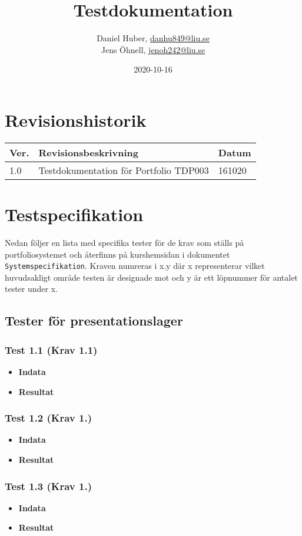 \documentclass{TDP003mall}
\author{Daniel Huber, \url{danhu849@liu.se}\\
  Jens Öhnell, \url{jenoh242@liu.se}}
\title{Testdokumentation}
\date{2020-10-16}
\begin{document}
\projectpage
\section{Revisionshistorik}
\begin{table}[!h]
\begin{tabularx}{\linewidth}{|l|X|l|}
\hline
Ver. & Revisionsbeskrivning & Datum \\\hline
1.0 & Testdokumentation för Portfolio TDP003 & 161020 \\\hline
\end{tabularx}
\end{table}


\section{Testspecifikation}
Nedan följer en lista med specifika tester för de krav som ställs på portfoliosystemet och återfinns på kurshemsidan i dokumentet \texttt{Systemspecifikation}. Kraven numreras i x.y där x representerar vilket huvudsakligt område testen är designade mot och y är ett löpnummer för antalet tester under x.

\subsection{Tester för presentationslager}
\subsubsection*{Test 1.1 (Krav 1.1)}
\begin{itemize}
\item[]\textbf{Indata} 
\item[]\textbf{Resultat} 
\end{itemize}
\subsubsection*{Test 1.2 (Krav 1.)}
\begin{itemize}
\item[]\textbf{Indata} 
\item[]\textbf{Resultat} 
\end{itemize}
\subsubsection*{Test 1.3 (Krav 1.)}
\begin{itemize}
\item[]\textbf{Indata} 
\item[]\textbf{Resultat} 
\end{itemize} 
\end{document}
